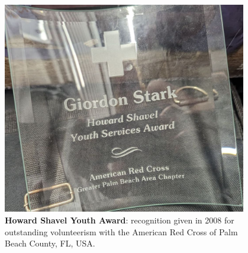 \begin{figure}[h!]
  \centering
  \caption{\textbf{Howard Shavel Youth Award}: recognition given in 2008 for outstanding volunteerism with the American Red Cross of Palm Beach County, FL, USA.}
  \includegraphics[width=0.95\textwidth]{attachments/G-outreach/howardShavelYouthAward}
\end{figure}





